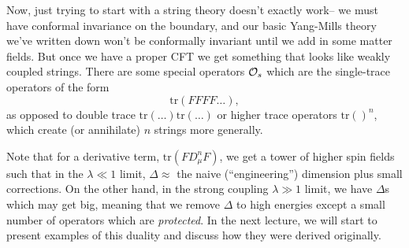 Now, just trying to start with a string theory doesn't exactly work-- we must have conformal invariance on the boundary, and our basic Yang-Mills theory we've written down won't be conformally invariant until we add in some matter fields. But once we have a proper CFT we get something that looks like weakly coupled strings. There are some special operators $\mathcal O_s$ which are the single-trace operators of the form
\begin{equation}
    \text{tr}(FFFF\ldots),
\end{equation}
as opposed to double trace $\text{tr}(\ldots)\text{tr}(\ldots)$ or higher trace operators $\text{tr}()^n$, which create (or annihilate) $n$ strings more generally. 

Note that for a derivative term, $\text{tr}(F D_\mu^n F)$, we get a tower of higher spin fields such that in the $\lambda \ll 1$ limit, $\Delta \approx$ the naive (``engineering'') dimension plus small corrections. On the other hand, in the strong coupling $\lambda \gg 1$ limit, we have $\Delta$s which may get big, meaning that we remove $\Delta$ to high energies except a small number of operators which are \emph{protected}. In the next lecture, we will start to present examples of this duality and discuss how they were derived originally.
